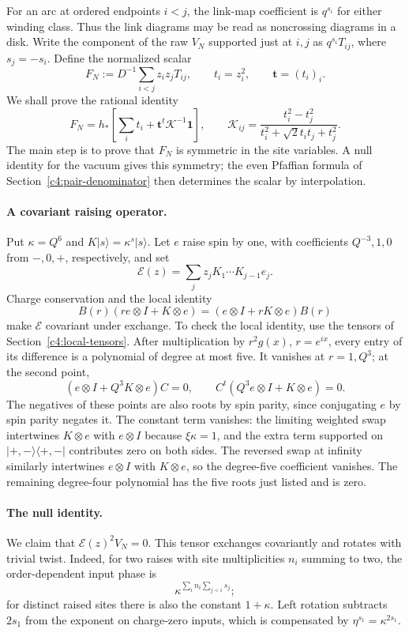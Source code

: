 For an arc at ordered endpoints $i<j$, the link-map coefficient is
$q^{s_i}$ for either winding class. Thus the link diagrams may be read
as noncrossing diagrams in a disk. Write the component of the raw
$V_N$ supported just at $i,j$ as $q^{s_i}T_{ij}$, where $s_j=-s_i$.
Define the normalized scalar
\[
 F_N:=D^{-1}\sum_{i<j}z_i z_jT_{ij},\qquad t_i=z_i^2,
 \qquad \mathbf t=(t_i)_i.
\]
We shall prove the rational identity
\begin{equation}
 F_N=h_*\left[\sum_i t_i+\mathbf t^t\mathcal K^{-1}\mathbf1\right],
 \qquad
 \mathcal K_{ij}=\frac{t_i^2-t_j^2}{t_i^2+\sqrt2t_it_j+t_j^2}.
 \label{c4:BC}
\end{equation}
The main step is to prove that $F_N$ is symmetric in the site variables.
A null identity for the vacuum gives this symmetry; the even Pfaffian
formula of Section~\ref{c4:pair-denominator} then determines the scalar
by interpolation.

\paragraph{A covariant raising operator.}
Put $\kappa=Q^6$ and $K|s\rangle=\kappa^s|s\rangle$. Let $e$ raise
spin by one, with coefficients $Q^{-3},1,0$ from $-,0,+$, respectively,
and set
\[
 \mathcal E(z)=\sum_j z_jK_1\cdots K_{j-1}e_j.
\]
Charge conservation and the local identity
\[
 B(r)(r e\otimes I+K\otimes e)
       =(e\otimes I+r K\otimes e)B(r)
\]
make $\mathcal E$ covariant under exchange. To check the local identity,
use the tensors of Section~\ref{c4:local-tensors}. After multiplication
by $r^2g(x)$, $r=e^{ix}$, every entry of its difference is a polynomial
of degree at most five. It vanishes at $r=1,Q^3$; at the second point,
\[
 (e\otimes I+Q^3K\otimes e)C=0,\qquad
 C^t(Q^3e\otimes I+K\otimes e)=0.
\]
The negatives of these points are also roots by spin parity, since
conjugating $e$ by spin parity negates it. The constant term vanishes:
the limiting weighted swap intertwines $K\otimes e$ with $e\otimes I$
because $\xi\kappa=1$, and the extra term supported on
$|+,-\rangle\langle+,-|$ contributes zero on both sides. The reversed
swap at infinity similarly intertwines $e\otimes I$ with $K\otimes e$,
so the degree-five coefficient vanishes. The remaining degree-four
polynomial has the five roots just listed and is zero.

\paragraph{The null identity.}
We claim that $\mathcal E(z)^2V_N=0$. This tensor exchanges covariantly
and rotates with trivial twist. Indeed, for two raises with site
multiplicities $n_i$ summing to two, the order-dependent input phase is
\[
 \kappa^{\sum_i n_i\sum_{j<i}s_j};
\]
for distinct raised sites there is also the constant $1+\kappa$.
Left rotation subtracts $2s_1$ from the exponent on charge-zero inputs,
which is compensated by $\eta^{s_1}=\kappa^{2s_1}$.

